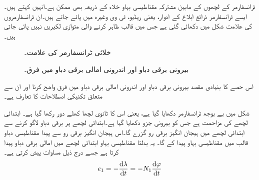 ٹرانسفارمر کے لچھوں کے مابین مشترکہ مقناطیسی بہاو خلاء کے ذریعہ بھی ممکن ہے۔انہیں   کہتے ہیں۔ ایسے ٹرانسفارمر ذرائع ابلاغ کے ادوار، یعنی ریڈیو، ٹی وی وغیرہ میں پائے جاتے ہیں۔ان ٹرانسفارمروں کی علامت  شکل  میں دکھائی گئی ہے  جس میں  قالب ظاہر کرنے والی متوازی لکیریں نہیں پائی جاتی ہیں۔
\begin{figure}
\centering
\begin{minipage}{0.30\textwidth}
\centering
{}
\caption{خلائی ٹرانسفارمر کی علامت۔}
\label{شکل_ٹرانسفارمر_خلائی_قالب_علامت}
\end{minipage}%
\begin{minipage}{0.60\textwidth}
\centering
\caption{بیرونی برقی دباو اور اندرونی امالی برقی دباو میں فرق۔}
\label{شکل_ٹرانسفارمر_بیرونی_اور_اندرونی_برقی_دباو}
\end{minipage}
\end{figure}


اس حصے کا بنیادی مقصد بیرونی برقی دباو   اور اندرونی امالی برقی دباو   میں فرق واضح کرنا اور ان سے متعلق  تکنیکی اصطلاحات کا تعارف  ہے۔

شکل   میں بے بوجھ ٹرانسفارمر دکھایا گیا ہے، یعنی اس کا ثانوی لچھا  کھلے دور رکھا گیا ہے۔ ابتدائی لچھے کی مزاحمت  ہے جس کو بیرونی جزو دکھایا گیا ہے۔ابتدائی لچھے پر  برقی دباو لاگو کرنے سے ابتدائی لچھے میں ہیجان انگیز برقی رو  گزرے گا۔اس ہیجان انگیز برقی رو سے پیدا مقناطیسی دباو   قالب میں مقناطیسی بہاو   پیدا کے گا۔ یہ بدلتا مقناطیسی بہاو ابتدائی لچھے میں امالی برقی  دباو   پیدا کرتا ہے جسے درج ذیل مساوات پیش کرتی ہے۔
\begin{align}
e_1=-\frac{\dif \lambda}{\dif t}=-N_1 \frac{\dif \varphi}{\dif t}
\end{align}

